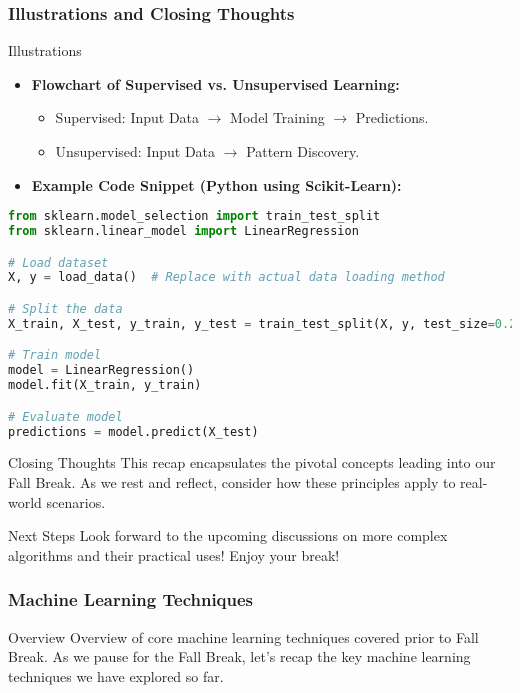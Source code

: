 \documentclass[aspectratio=169]{beamer}
\begin{document}
\begin{frame}[fragile]
    \frametitle{Illustrations and Closing Thoughts}
    \begin{block}{Illustrations}
        \begin{itemize}
            \item \textbf{Flowchart of Supervised vs. Unsupervised Learning:}
                \begin{itemize}
                    \item Supervised: Input Data $\rightarrow$ Model Training $\rightarrow$ Predictions.
                    \item Unsupervised: Input Data $\rightarrow$ Pattern Discovery.
                \end{itemize}
            \item \textbf{Example Code Snippet (Python using Scikit-Learn):}
        \end{itemize}
    \end{block}
    
    \begin{lstlisting}[language=Python]
from sklearn.model_selection import train_test_split
from sklearn.linear_model import LinearRegression

# Load dataset
X, y = load_data()  # Replace with actual data loading method

# Split the data
X_train, X_test, y_train, y_test = train_test_split(X, y, test_size=0.2, random_state=42)

# Train model
model = LinearRegression()
model.fit(X_train, y_train)

# Evaluate model
predictions = model.predict(X_test)
    \end{lstlisting}

    \begin{block}{Closing Thoughts}
        This recap encapsulates the pivotal concepts leading into our Fall Break. As we rest and reflect, consider how these principles apply to real-world scenarios. 
    \end{block}
    
    \begin{block}{Next Steps}
        Look forward to the upcoming discussions on more complex algorithms and their practical uses! Enjoy your break!
    \end{block}
\end{frame}

\begin{frame}[fragile]
    \frametitle{Machine Learning Techniques}
    \begin{block}{Overview}
        Overview of core machine learning techniques covered prior to Fall Break.
        As we pause for the Fall Break, let's recap the key machine learning techniques we have explored so far.
    \end{block}
\end{frame}
\end{document}
